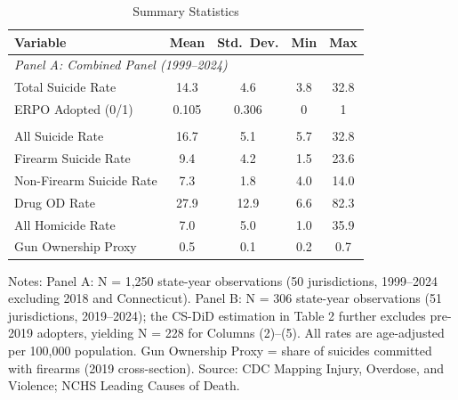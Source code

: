 \begin{table}[H]
\centering
\caption{Summary Statistics}
\label{tab:summary}
\begin{threeparttable}
\begin{tabular}{lcccc}
\toprule
Variable & Mean & Std.\ Dev. & Min & Max \\
\midrule
\multicolumn{5}{l}{\textit{Panel A: Combined Panel (1999--2024)}} \\
Total Suicide Rate & 14.3 & 4.6 & 3.8 & 32.8 \\
ERPO Adopted (0/1) & 0.105 & 0.306 & 0 & 1 \\
\addlinespace
\multicolumn{5}{l}{\textit{Panel B: Short Panel (2019--2024)}} \\
All Suicide Rate & 16.7 & 5.1 & 5.7 & 32.8 \\
Firearm Suicide Rate & 9.4 & 4.2 & 1.5 & 23.6 \\
Non-Firearm Suicide Rate & 7.3 & 1.8 & 4.0 & 14.0 \\
Drug OD Rate & 27.9 & 12.9 & 6.6 & 82.3 \\
All Homicide Rate & 7.0 & 5.0 & 1.0 & 35.9 \\
Gun Ownership Proxy & 0.5 & 0.1 & 0.2 & 0.7 \\
\bottomrule
\end{tabular}
\begin{tablenotes}[flushleft]
\small
\item Notes: Panel A: N = 1,250 state-year observations (50 jurisdictions, 1999--2024 excluding 2018 and Connecticut). Panel B: N = 306 state-year observations (51 jurisdictions, 2019--2024); the CS-DiD estimation in Table 2 further excludes pre-2019 adopters, yielding N = 228 for Columns (2)--(5). All rates are age-adjusted per 100,000 population. Gun Ownership Proxy = share of suicides committed with firearms (2019 cross-section). Source: CDC Mapping Injury, Overdose, and Violence; NCHS Leading Causes of Death.
\end{tablenotes}
\end{threeparttable}
\end{table}
